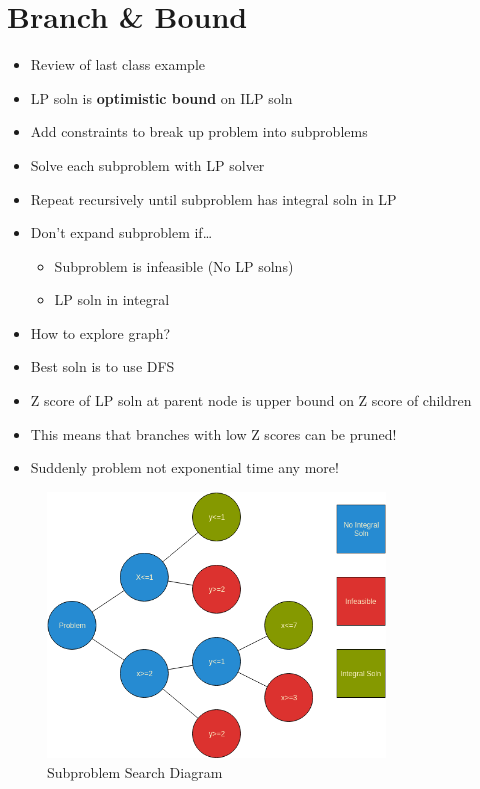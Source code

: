 \documentclass[12pt, letter]{article}
\begin{document}
\section{Branch \& Bound}%
\label{sec:branch_&_bound}
\begin{itemize}
	\item Review of last class example
	\item LP soln is \textbf{optimistic bound} on ILP soln
	\item Add constraints to break up problem into subproblems
	\item Solve each subproblem with LP solver
	\item Repeat recursively until subproblem has integral soln in LP
	\item Don't expand subproblem if\ldots
	\begin{itemize}
		\item Subproblem is infeasible (No LP solns)
		\item LP soln in integral
	\end{itemize}
	\item How to explore graph?
	\item Best soln is to use DFS
	\item Z score of LP soln at parent node is upper bound on Z score of children
	\item This means that branches with low Z scores can be pruned!
	\item Suddenly problem not exponential time any more!
\end{itemize}
\begin{figure}[h]
	\centering
	\includegraphics[width=0.8\textwidth]{search}
	\caption{Subproblem Search Diagram}
	\label{fig:search}
\end{figure}
\end{document}
